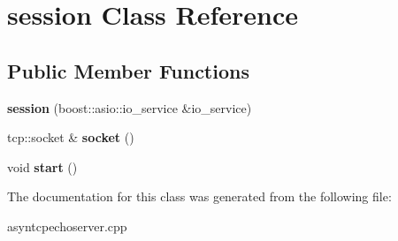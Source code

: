 \hypertarget{classsession}{}\section{session Class Reference}
\label{classsession}
\subsection*{Public Member Functions}
\begin{DoxyCompactItemize}
\item 
\mbox{\label{classsession_ae8ec671941d1b8c7ac1b54978692cc85}} 
{\bfseries session} (boost\+::asio\+::io\+\_\+service \&io\+\_\+service)
\item 
\mbox{\label{classsession_a877765bc7124ada6580ad2f748b4d72c}} 
tcp\+::socket \& {\bfseries socket} ()
\item 
\mbox{\label{classsession_ad69144e27f558b8960efae132f2e15f4}} 
void {\bfseries start} ()
\end{DoxyCompactItemize}


The documentation for this class was generated from the following file\+:\begin{DoxyCompactItemize}
\item 
asyntcpechoserver.\+cpp\end{DoxyCompactItemize}
